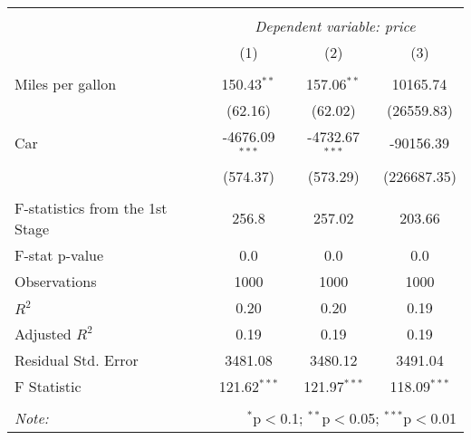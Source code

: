 \begin{table}[!htbp] \centering
\begin{tabular}{@{\extracolsep{5pt}}lccc}
\\[-1.8ex]\hline
\hline \\[-1.8ex]
& \multicolumn{3}{c}{\textit{Dependent variable: price}} \
\cr \cline{2-4}
\\[-1.8ex] & (1) & (2) & (3) \\
\hline \\[-1.8ex]
 Miles per gallon & 150.43$^{**}$ & 157.06$^{**}$ & 10165.74$^{}$ \\
& (62.16) & (62.02) & (26559.83) \\
 Car & -4676.09$^{***}$ & -4732.67$^{***}$ & -90156.39$^{}$ \\
& (574.37) & (573.29) & (226687.35) \\
\hline \\[-1.8ex]
 F-statistics from the 1st Stage & 256.8 & 257.02 & 203.66 \\
 F-stat p-value & 0.0 & 0.0 & 0.0 \\
 Observations & 1000 & 1000 & 1000 \\
 $R^2$ & 0.20 & 0.20 & 0.19 \\
 Adjusted $R^2$ & 0.19 & 0.19 & 0.19 \\
 Residual Std. Error & 3481.08 & 3480.12 & 3491.04 \\
 F Statistic & 121.62$^{***}$ & 121.97$^{***}$ & 118.09$^{***}$ \\
\hline
\hline \\[-1.8ex]
\textit{Note:} & \multicolumn{3}{r}{$^{*}$p$<$0.1; $^{**}$p$<$0.05; $^{***}$p$<$0.01} \\
\end{tabular}
\end{table}